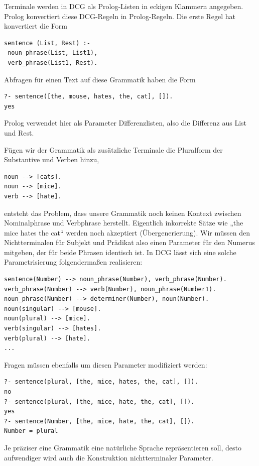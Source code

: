 Terminale werden in DCG als Prolog-Listen in eckigen Klammern angegeben.
Prolog konvertiert diese DCG-Regeln in Prolog-Regeln.
Die erste Regel hat konvertiert die Form

\begin{verbatim}
sentence (List, Rest) :-
 noun_phrase(List, List1),
 verb­_phrase(List1, Rest).
\end{verbatim}

Abfragen für einen Text auf diese Grammatik haben die Form
\begin{verbatim}
?- sentence([the, mouse, hates, the, cat], []).
yes
\end{verbatim}

Prolog verwendet hier als Parameter Differenzlisten, also die Differenz aus List und Rest.

Fügen wir der Grammatik als zusätzliche Terminale die Pluralform der Substantive und Verben hinzu,

\begin{verbatim}
noun --> [cats].
noun --> [mice].
verb --> [hate].
\end{verbatim}

entsteht das Problem, dass unsere Grammatik noch keinen Kontext zwischen Nominalphrase und Verbphrase herstellt.
Eigentlich inkorrekte Sätze wie „the mice hates the cat“ werden noch akzeptiert (Übergenerierung).
Wir müssen den Nichtterminalen für Subjekt und Prädikat also einen Parameter für den Numerus mitgeben, der für beide Phrasen identisch ist.
In DCG lässt sich eine solche Parametrisierung folgendermaßen realisieren:

\begin{verbatim}
sentence(Number) --> noun_phrase(Number), verb_phrase(Number).
verb_phrase(Number) --> verb(Number), noun_phrase(Number1).
noun_phrase(Number) --> determiner(Number), noun(Number).
noun(singular) --> [mouse].
noun(plural) --> [mice].
verb(singular) --> [hates].
verb(plural) --> [hate].
...
\end{verbatim}


Fragen müssen ebenfalls um diesen Parameter modifiziert werden:

\begin{verbatim}
?- sentence(plural, [the, mice, hates, the, cat], []).
no
?- sentence(plural, [the, mice, hate, the, cat], []).
yes
?- sentence(Number, [the, mice, hate, the, cat], []).
Number = plural
\end{verbatim}

Je präziser eine Grammatik eine natürliche Sprache repräsentieren soll, desto aufwendiger wird auch die Konstruktion nichtterminaler Parameter.

